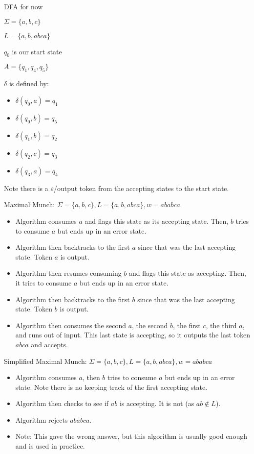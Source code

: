 \documentclass{article}
\begin{document}
DFA for now

\(\Sigma = \{a,b,c\}\)

\(L = \{a,b,abca\}\)

\(q_0\) is our start state

\(A = \{q_1, q_4, q_5\}\)

\(\delta\) is defined by:
\begin{itemize}
    \item \(\delta(q_0, a) = q_1\)
    \item \(\delta(q_0, b) = q_5\)
    \item \(\delta(q_1, b) = q_2\)
    \item \(\delta(q_2, c) = q_3\)
    \item \(\delta(q_3, a) = q_4\)
\end{itemize}


Note there is a \(\varepsilon\)/output token from the accepting states
to the start state.

Maximal Munch: \(\Sigma = \{a,b,c\}, L = \{a,b,abca\}, w = ababca\)
\begin{itemize}
    \item Algorithm consumes \(a\) and flags this state as its accepting state. Then, \(b\) tries to consume \(a\) but ends up in an error state.
    \item Algorithm then backtracks to the first \(a\) since that was the last accepting state. Token \(a\) is output.
    \item Algorithm then resumes consuming \(b\) and flags this state as accepting. Then, it tries to consume \(a\) but ends up in an error state.
    \item Algorithm then backtracks to the first \(b\) since that was the last accepting state. Token \(b\) is output.
    \item Algorithm then consumes the second \(a\), the second \(b\), the first \(c\), the third \(a\), and runs out of input. This last state is accepting, so it outputs the last token \(abca\) and accepts.
\end{itemize}


Simplified Maximal Munch:
\(\Sigma = \{a,b,c\}, L = \{a,b,abca\}, w = ababca\) \begin{itemize}
    \item Algorithm consumes \(a\), then \(b\) tries to consume \(a\) but ends up in an error state. Note there is no keeping track of the first accepting state.
    \item Algorithm then checks to see if \(ab\) is accepting. It is not (as \(ab \not \in L\)).
    \item Algorithm rejects \(ababca\).
    \item Note: This gave the wrong answer, but this algorithm is usually good enough and is used in practice.
\end{itemize}
\end{document}
